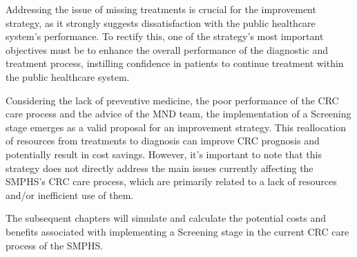 Addressing the issue of missing treatments is crucial for the improvement strategy, as it strongly suggests dissatisfaction with the public healthcare system's performance. To rectify this, one of the strategy's most important objectives must be to enhance the overall performance of the diagnostic and treatment process, instilling confidence in patients to continue treatment within the public healthcare system.

Considering the lack of preventive medicine, the poor performance of the CRC care process and the advice of the MND team, the implementation of a Screening stage emerges as a valid proposal for an improvement strategy. This reallocation of resources from treatments to diagnosis can improve CRC prognosis and potentially result in cost savings. However, it's important to note that this strategy does not directly address the main issues currently affecting the SMPHS's CRC care process, which are primarily related to a lack of resources and/or inefficient use of them.

The subsequent chapters will simulate and calculate the potential costs and benefits associated with implementing a Screening stage in the current CRC care process of the SMPHS.

